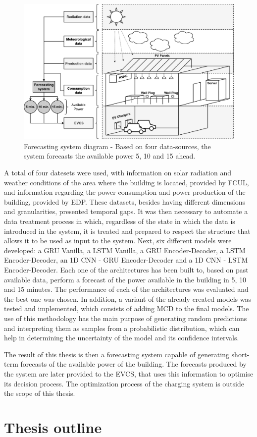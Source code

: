 \begin{figure}[h!]
    \centering
    \begin{center}
    \includegraphics[width=1\textwidth]{Images/BUILDING.png}
    \caption{Forecasting system diagram - Based on four data-sources, the system forecasts the available power 5, 10 and 15 ahead.}
    \label{building}
    \end{center}
\end{figure}


A total of four datesets were used, with information on solar radiation and weather conditions of the area where the building is located, provided by \ac{FCUL}, and information regarding the power consumption and power production of the building, provided by \ac{EDP}. These datasets, besides having different dimensions and granularities, presented temporal gaps. It was then necessary to automate a data treatment process in which, regardless of the state in which the data is introduced in the system, it is treated and prepared to respect the structure that allows it to be used as input to the system. Next, six different models were developed: a \ac{GRU} Vanilla, a \ac{LSTM} Vanilla, a \ac{GRU} Encoder-Decoder, a \ac{LSTM} Encoder-Decoder, an \ac{1D CNN} - \ac{GRU} Encoder-Decoder and a \ac{1D CNN} - \ac{LSTM} Encoder-Decoder. Each one of the architectures has been built to, based on past available data, perform a forecast of the power available in the building in 5, 10 and 15 minutes. The performance of each of the architectures was evaluated and the best one was chosen. In addition, a variant of the already created models was tested and implemented, which consists of adding \ac{MCD} to the final models. The use of this methodology has the main purpose of generating random predictions and interpreting them as samples from a probabilistic distribution, which can help in determining the uncertainty of the model and its confidence intervals.

The result of this thesis is then a forecasting system capable of generating short-term forecasts of the available power of the building. The forecasts produced by the system are later provided to the \ac{EVCS}, that uses this information to optimise its decision process. The optimization process of the charging system is outside the scope of this thesis.

\section{Thesis outline}
